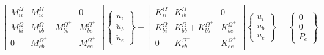 \documentclass[12pt,letterpaper]{article}
\begin{document}
\begin{equation}
\left[ {\begin{array}{*{20}{c}}
{M_{ii}^\Omega }&{M_{ib}^\Omega }&0\\
{M_{bi}^\Omega }&{M_{bb}^\Omega  + M_{bb}^{{\Omega ^ + }}}&{M_{be}^{{\Omega ^ + }}}\\
0&{M_{eb}^{{\Omega ^ + }}}&{M_{ee}^{{\Omega ^ + }}}
\end{array}} \right]\left\{ {\begin{array}{*{20}{c}}
{{{\ddot u}_i}}\\
{{{\ddot u}_b}}\\
{{{\ddot u}_e}}
\end{array}} \right\} + \left[ {\begin{array}{*{20}{c}}
{K_{ii}^\Omega }&{K_{ib}^\Omega }&0\\
{K_{bi}^\Omega }&{K_{bb}^\Omega  + K_{bb}^{{\Omega ^ + }}}&{K_{be}^{{\Omega ^ + }}}\\
0&{K_{eb}^{{\Omega ^ + }}}&{K_{ee}^{{\Omega ^ + }}}
\end{array}} \right]\left\{ {\begin{array}{*{20}{c}}
{{u_i}}\\
{{u_b}}\\
{{u_e}}
\end{array}} \right\} = \left\{ {\begin{array}{*{20}{c}}
0\\
0\\
{{P_e}}
\end{array}} \right\}
\label{coupled}
\end{equation}
\end{document}
